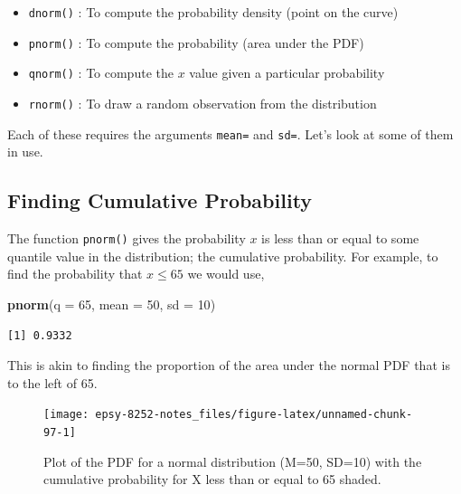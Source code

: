\documentclass[]{book}
\newenvironment{Shaded}{\begin{snugshade}}{\end{snugshade}}
\newcommand{\DataTypeTok}[1]{\textcolor[rgb]{0.13,0.29,0.53}{#1}}
\newcommand{\DecValTok}[1]{\textcolor[rgb]{0.00,0.00,0.81}{#1}}
\newcommand{\KeywordTok}[1]{\textcolor[rgb]{0.13,0.29,0.53}{\textbf{#1}}}
\newcommand{\NormalTok}[1]{#1}
\providecommand{\tightlist}{%
  \setlength{\itemsep}{0pt}\setlength{\parskip}{0pt}}
\begin{document}
\begin{itemize}
\tightlist
\item
  \texttt{dnorm()} : To compute the probability density (point on the curve)
\item
  \texttt{pnorm()} : To compute the probability (area under the PDF)
\item
  \texttt{qnorm()} : To compute the \(x\) value given a particular probability
\item
  \texttt{rnorm()} : To draw a random observation from the distribution
\end{itemize}

Each of these requires the arguments \texttt{mean=} and \texttt{sd=}. Let's look at some of them in use.

\hypertarget{finding-cumulative-probability}{%
\subsection{Finding Cumulative Probability}\label{finding-cumulative-probability}}

The function \texttt{pnorm()} gives the probability \(x\) is less than or equal to some quantile value in the distribution; the cumulative probability. For example, to find the probability that \(x \leq 65\) we would use,

\begin{Shaded}
\begin{Highlighting}[]
\KeywordTok{pnorm}\NormalTok{(}\DataTypeTok{q =} \DecValTok{65}\NormalTok{, }\DataTypeTok{mean =} \DecValTok{50}\NormalTok{, }\DataTypeTok{sd =} \DecValTok{10}\NormalTok{)}
\end{Highlighting}
\end{Shaded}

\begin{verbatim}
[1] 0.9332
\end{verbatim}

This is akin to finding the proportion of the area under the normal PDF that is to the left of 65.

\begin{figure}

{\centering \texttt{[image: epsy-8252-notes\_files/figure-latex/unnamed-chunk-97-1]} 

}

\caption{Plot of the PDF for a normal distribution (M=50, SD=10) with the cumulative probability for X less than or equal to 65 shaded.}\label{fig:unnamed-chunk-97}
\end{figure}
\end{document}

